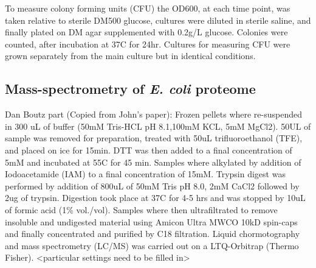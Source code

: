 \documentclass[12pt]{article}
\begin{document}
To measure colony forming units (CFU) the OD600, at each time point, was taken relative to sterile DM500 glucose, cultures were diluted in sterile saline, and finally plated on DM agar supplemented with 0.2g/L glucose. Colonies were counted, after incubation at 37C for 24hr. Cultures for measuring CFU were grown separately from the main culture but in identical conditions. 

\subsection{Mass-spectrometry of \emph{E. coli} proteome} 
Dan Boutz part (Copied from John’s paper):
Frozen pellets where re-suspended in 300 uL of buffer (50mM Tris-HCL pH 8.1,100mM KCL, 5mM MgCl2). 50UL of sample was removed for preparation, treated with 50uL trifluoroethanol (TFE), and placed on ice for 15min. DTT was then added to a final concentration of 5mM and incubated at 55C for 45 min. Samples where alkylated by addition of Iodoacetamide (IAM) to a final concentration of 15mM. Trypsin digest was performed by addition of 800uL of 50mM Tris pH 8.0, 2mM CaCl2 followed by 2ug of trypsin. Digestion took place at 37C for 4-5 hrs and was stopped by 10uL of formic acid (1\% vol./vol). Samples where then ultrafiltrated to remove insoluble and undigested material using Amicon Ultra MWCO 10kD spin-caps and finally concentrated and purified by C18 filtration. 
Liquid chormotography and mass spectrometry (LC/MS) was carried out on a LTQ-Orbitrap (Thermo Fisher). <particular settings need to be filled in>
\end{document}
